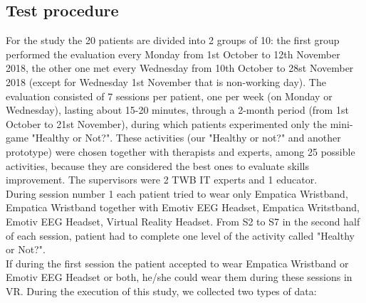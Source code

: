 \subsection{Test procedure}
For the study the 20 patients are divided into 2 groups of 10: the first group performed the evaluation every Monday from 1st October to 12th November 2018, the other one met every Wednesday from 10th October to 28st November 2018 (except for Wednesday 1st November that is non-working day). The evaluation consisted of 7 sessions per patient, one per week (on Monday or Wednesday), lasting about 15-20 minutes, through a 2-month period (from 1st October to 21st November), during which patients experimented only the mini-game "Healthy or Not?". These activities (our "Healthy or not?" and another prototype) were chosen together with therapists and experts, among 25 possible activities, because they are considered the best ones to evaluate skills improvement. The supervisors were 2 TWB IT experts and 1 educator.\\
During session number 1 each patient tried to wear only Empatica Wristband, Empatica Wristband together with Emotiv EEG Headset, Empatica Writstband, Emotiv EEG Headset, Virtual Reality Headset. From S2 to S7 in the second half of each session, patient had to complete one level of the activity called "Healthy or Not?".\\
If during the first session the patient accepted to wear Empatica Wristband or Emotiv EEG Headset or both, he/she could wear them during these sessions in VR. 
During the execution of this study, we collected two types of data:
